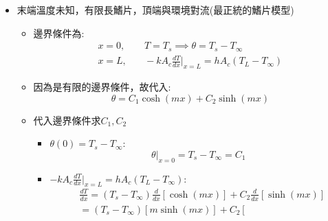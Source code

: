 \documentclass[../main.tex]{subfiles}
\begin{document}
\begin{itemize}
\begin{itemize}
\begin{itemize}
\begin{align}
        &= \frac{\sqrt{hPkA_c}}{h P L} \frac{(T_s - T_\infty) \cosh\left(L\sqrt{\frac{hP}{kA_c}}\right) - (T_L - T_\infty)}
        {(T_s - T_\infty) \sinh\left(L\sqrt{\frac{hP}{kA_c}}\right)} \nonumber\\
        &= \frac{1}{L} \sqrt{\frac{kA_c}{hP}} \frac{ \cosh\left(L\sqrt{\frac{hP}{kA_c}}\right) - \frac{T_L - T_\infty}{T_s - T_\infty}}
        {\sinh\left(L\sqrt{\frac{hP}{kA_c}}\right)} \nonumber\\
        &=\boxed{\frac{1}{L}\sqrt{\frac{kA_c}{hP}}\tanh\left(L\sqrt{\frac{hP}{kA_c}}\right)
         - \frac{1}{L}\sqrt{\frac{kA_c}{hP}} \frac{\frac{T_L - T_\infty}{T_s - T_\infty}}{\sinh\left(L\sqrt{\frac{hP}{kA_c}}\right)} } \label{eq:heat_transfer_fin_finite_knownT_efficiency}
      \end{align}
    \end{itemize}
    \item 末端溫度未知，有限長鰭片，頂端與環境對流(最正統的鰭片模型)
    \begin{itemize}
      \item 邊界條件為:
      \begin{align}
        x=0,&\quad T=T_s \implies \theta = T_s - T_\infty \nonumber\\
        x=L,&\quad -kA_c \frac{dT}{dx}\bigg|_{x=L} = h A_c (T_L - T_\infty)
      \end{align}
      \item 因為是有限的邊界條件，故代入:
      \begin{equation}
        \theta = C_1 \cosh(mx) + C_2 \sinh(mx)
      \end{equation}
      \item 代入邊界條件求$C_1, C_2$
      \begin{itemize}
        \item $\theta(0)=T_s - T_\infty$:
        \begin{equation}
          \theta|_{x=0} = T_s - T_\infty = C_1 \label{eq:heat_transfer_fin_finite_conv_boundary_condition_1}
        \end{equation}
        \item $-kA_c \frac{dT}{dx}\bigg|_{x=L} = h A_c (T_L - T_\infty)$:
        \begin{align}
          & \frac{dT}{dx} = (T_s - T_\infty) \frac{d}{dx}\left[
            \cosh(mx)
          \right] + C_2 \frac{d}{dx}\left[
            \sinh(mx)
          \right] \nonumber\\
          &= (T_s - T_\infty) \left[
            m \sinh(mx)
          \right] + C_2 \left[

\end{align}
\end{itemize}
\end{itemize}
\end{itemize}
\end{itemize}
\end{document}
